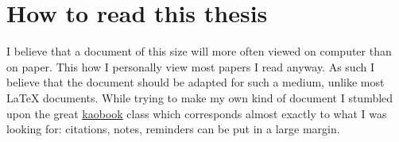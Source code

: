 \chapter*{How to read this thesis}

I believe that a document of this size will more often viewed on computer than
on paper. This how I personally view most papers I read anyway.
As such I believe that the document should be adapted for such a medium, unlike
most \LaTeX{} documents.
While trying to make my own kind of document I stumbled upon the great
\href{https://github.com/fmarotta/kaobook/}{kaobook} class which corresponds
almost exactly to what I was looking for: citations, notes, reminders can be put
in a large margin.

\begin{minidocument}


  \Blindtext
\end{minidocument}

\begin{figure}[hb]
  \lastminidocument
\end{figure}